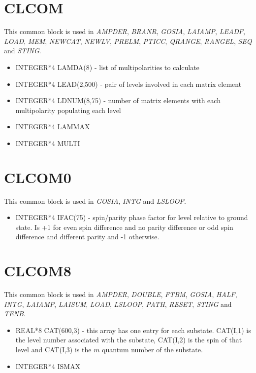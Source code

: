 \section{CLCOM}

This common block is used in {\em AMPDER}, {\em BRANR}, {\em GOSIA}, {\em
LAIAMP}, {\em LEADF}, {\em LOAD}, {\em MEM}, {\em NEWCAT}, {\em NEWLV}, {\em
PRELM}, {\em PTICC}, {\em QRANGE}, {\em RANGEL}, {\em SEQ} and {\em STING}.

\begin{itemize}
\item INTEGER*4 LAMDA(8) - list of multipolarities to calculate
\item INTEGER*4 LEAD(2,500) - pair of levels involved in each matrix element
\item INTEGER*4 LDNUM(8,75) - number of matrix elements with each multipolarity populating each level
\item INTEGER*4 LAMMAX
\item INTEGER*4 MULTI
\end{itemize}

\section{CLCOM0}

This common block is used in {\em GOSIA}, {\em INTG} and {\em LSLOOP}.

\begin{itemize}
\item INTEGER*4 IFAC(75) - spin/parity phase factor for level relative to
ground state. Is +1 for even spin difference and no parity difference or odd
spin difference and different parity and -1 otherwise.
\end{itemize}

\section{CLCOM8}

This common block is used in {\em AMPDER}, {\em DOUBLE}, {\em FTBM}, {\em
GOSIA}, {\em HALF}, {\em INTG}, {\em LAIAMP}, {\em LAISUM}, {\em LOAD}, {\em
LSLOOP}, {\em PATH}, {\em RESET}, {\em STING} and {\em TENB}.

\begin{itemize}
\item REAL*8 CAT(600,3) - this array has one entry for each substate.
CAT(I,1) is the level number associated with the substate, CAT(I,2) is the
spin of that level and CAT(I,3) is the $m$ quantum number of the substate.
\item INTEGER*4 ISMAX
\end{itemize}

